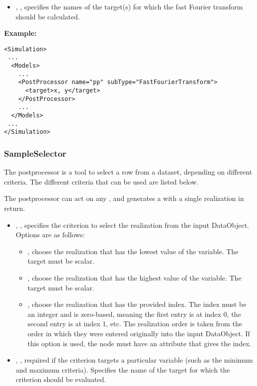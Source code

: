 %
\begin{itemize}
  \item {}, , specifies the names of the
    target(s) for which the fast Fourier transform should be calculated.
 \end{itemize}
\textbf{Example:}

\begin{lstlisting}[style=XML]
<Simulation>
 ...
  <Models>
    ...
    <PostProcessor name="pp" subType="FastFourierTransform">
      <target>x, y</target>
    </PostProcessor>
    ...
  </Models>
 ...
</Simulation>
\end{lstlisting}
\subsubsection{SampleSelector}
\label{SampleSelectorPP}
The  postprocessor is a tool to select a row from a dataset, depending on different
criteria. The different criteria that can be used are listed below.

The  postprocessor can  act on any , and generates a
 with a single realization in return.

%
\begin{itemize}
  \item {}, , specifies the criterion to select the
    realization from the input DataObject. Options are as follows:
    \begin{itemize}
      \item {}, choose the realization that has the lowest value of the 
        variable. The target must be scalar.
      \item {}, choose the realization that has the highest value of the 
        variable. The target must be scalar.
      \item {}, choose the realization that has the provided index. The index must be an
        integer and is zero-based, meaning the first entry is at index 0, the second entry is at index 1, etc.
        The realization order is taken from the order in which they were entered originally into the input
        DataObject. If this option is used, the  node must have an 
        attribute that gives the index.
    \end{itemize}
  \item {}, , required if the criterion targets a particular
    variable (such as the minimum and maximum criteria). Specifies the name of the
    target for which the criterion should be evaluated.
\end{itemize}

